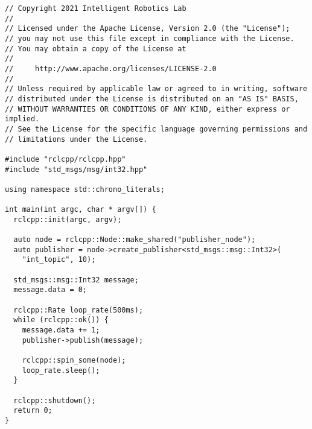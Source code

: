  \footnotesize
\begin{tcolorbox}[sharp corners, colframe=gray!80, colback=LightGray, left=0pt, top=0pt, bottom=0pt, title=\texttt{br2\_basics/src/publisher.cpp}]
  \begin{verbatim}
// Copyright 2021 Intelligent Robotics Lab
//
// Licensed under the Apache License, Version 2.0 (the "License");
// you may not use this file except in compliance with the License.
// You may obtain a copy of the License at
//
//     http://www.apache.org/licenses/LICENSE-2.0
//
// Unless required by applicable law or agreed to in writing, software
// distributed under the License is distributed on an "AS IS" BASIS,
// WITHOUT WARRANTIES OR CONDITIONS OF ANY KIND, either express or implied.
// See the License for the specific language governing permissions and
// limitations under the License.

#include "rclcpp/rclcpp.hpp"
#include "std_msgs/msg/int32.hpp"

using namespace std::chrono_literals;

int main(int argc, char * argv[]) {
  rclcpp::init(argc, argv);

  auto node = rclcpp::Node::make_shared("publisher_node");
  auto publisher = node->create_publisher<std_msgs::msg::Int32>(
    "int_topic", 10);

  std_msgs::msg::Int32 message;
  message.data = 0;

  rclcpp::Rate loop_rate(500ms);
  while (rclcpp::ok()) {
    message.data += 1;
    publisher->publish(message);

    rclcpp::spin_some(node);
    loop_rate.sleep();
  }

  rclcpp::shutdown();
  return 0;
}     \end{verbatim}
    \end{tcolorbox}
  \normalsize

